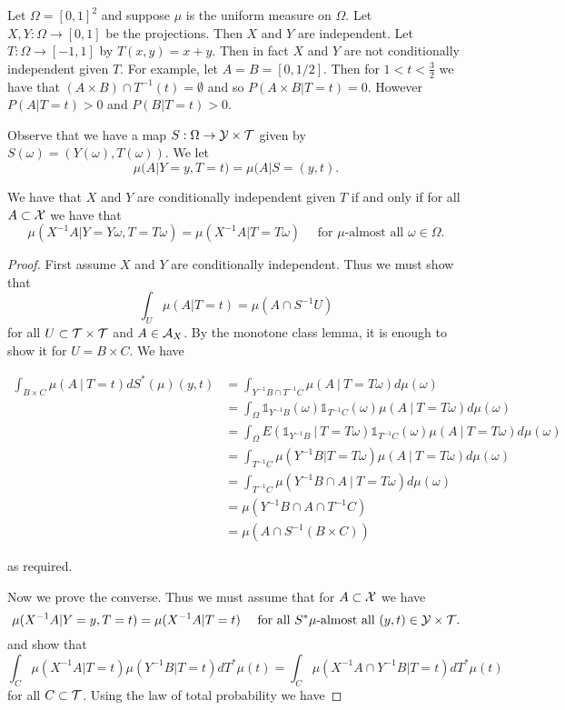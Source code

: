 \documentclass[twoside, a4paper, 10pt]{amsart}
\begin{document}
\begin{eg} Let $\Omega = [0,1]^2$ and suppose $\mu$ is the uniform measure on $\Omega$. Let $X,Y:\Omega \to [0,1]$ be the projections. Then $X$ and $Y$ are independent. Let $T:\Omega \to [-1,1]$ by $T(x,y) = x+y$. Then in fact $X$ and $Y$ are not conditionally independent given $T$. For example, let $A=B=[0,1/2]$. Then for $1< t < \frac{3}{2}$  we have that $(A \times B) \cap T^{-1}(t) = \emptyset$ and so $P(A \times B | T=t) = 0$. However $P(A|T=t)>0$ and $P(B|T=t)>0$.

Observe that we have a map $S:\Omega \to \mathcal{Y} \times \mathcal{T}$ given by $S(\omega)=(Y(\omega), T(\omega))$. We let $$\mu(A|Y=y, T=t) = \mu(A|S=(y,t).$$

\begin{lemma} We have that $X$ and $Y$ are conditionally independent given $T$ if and only if for all $A \subset \mathcal{X}$ we have that $$\mu(X^{-1}A | Y=Y\omega, T=T\omega) = \mu(X^{-1}A|T=T\omega) \quad \text{ for $\mu$-almost all } \omega \in \Omega.$$

\end{lemma}

\begin{proof} First assume $X$ and $Y$ are conditionally independent. Thus we must show that $$\int_{U}\mu(A|T=t) = \mu(A \cap S^{-1}U)$$ for all $U \subset \mathcal{T} \times \mathcal{T}$ and $A \in \mathcal{A}_X$. By the monotone class lemma, it is enough to show it for $U = B \times C$. We have 

\begin{align*} \int_{B \times C} \mu(A ~|~ T=t) dS^*(\mu)(y,t) &= \int_{Y^{-1}B \cap T^{-1}C} \mu(A ~|~ T=T\omega) d\mu(\omega) \\
&= \int_{\Omega} \mathds{1}_{Y^{-1}B}(\omega) \mathds{1}_{T^{-1}C}(\omega) \mu(A~|~ T=T\omega) d\mu(\omega) \\
&= \int_{\Omega} E(\mathds{1}_{Y^{-1}B}~|~T=T\omega) \mathds{1}_{T^{-1}C}(\omega) \mu(A ~|~ T=T\omega) d\mu(\omega) \\ 
&=  \int_{T^{-1}C} \mu(Y^{-1}B|T=T\omega) \mu(A ~|~ T=T\omega) d\mu(\omega) \\
&=  \int_{T^{-1}C} \mu(Y^{-1}B \cap A ~|~ T=T\omega)d\mu(\omega) \\
&= \mu(Y^{-1}B \cap A \cap T^{-1}C) \\
&= \mu(A \cap S^{-1}(B \times C)) \end{align*}

as required. 

Now we prove the converse. Thus we must assume that for $A \subset \mathcal{X}$ we have $$\mu(X^{-1}A | Y=y, T=t) = \mu(X^{-1}A|T=t) \quad \text{ for all $S^*\mu$-almost all $(y,t) \in \mathcal{Y} \times \mathcal{T}$.}$$ and show that $$\int_{C} \mu(X^{-1}A | T=t)\mu(Y^{-1}B | T=t) dT^*\mu(t) = \int_{C} \mu(X^{-1}A \cap Y^{-1}B | T=t) dT^*\mu(t)$$ for all $C \subset \mathcal{T}$. Using the law of total probability we have


\end{proof}
\end{eg}
\end{document}
